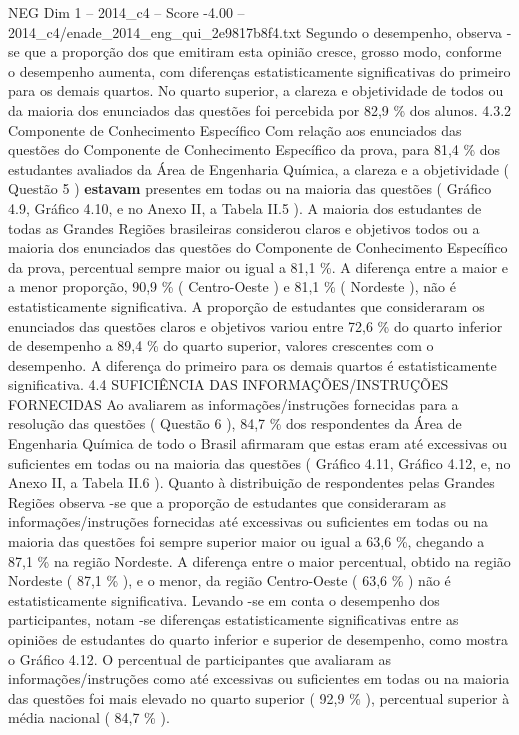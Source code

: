 \begin{textsample}{NEG Dim 1 – 2014\_c4 – Score -4.00 – 2014\_c4/enade\_2014\_eng\_qui\_2e9817b8f4.txt}
Segundo o desempenho, observa -se que a proporção dos que emitiram esta opinião cresce, grosso modo, conforme o desempenho aumenta, com diferenças estatisticamente significativas do primeiro para os demais quartos.
No quarto superior, a clareza e objetividade de todos ou da maioria dos enunciados das questões foi percebida por 82,9 \% dos alunos. 4.3.2 Componente de Conhecimento Específico Com relação aos enunciados das questões do Componente de Conhecimento Específico da prova, para 81,4 \% dos estudantes avaliados da Área de Engenharia Química, a clareza e a objetividade ( Questão 5 ) \textbf{estavam} presentes em todas ou na maioria das questões ( Gráfico 4.9, Gráfico 4.10, e no Anexo II, a Tabela II.5 ).
A maioria dos estudantes de todas as Grandes Regiões brasileiras considerou claros e objetivos todos ou a maioria dos enunciados das questões do Componente de Conhecimento Específico da prova, percentual sempre maior ou igual a 81,1 \%.
A diferença entre a maior e a menor proporção, 90,9 \% ( Centro-Oeste ) e 81,1 \% ( Nordeste ), não é estatisticamente significativa.
A proporção de estudantes que consideraram os enunciados das questões claros e objetivos variou entre 72,6 \% do quarto inferior de desempenho a 89,4 \% do quarto superior, valores crescentes com o desempenho.
A diferença do primeiro para os demais quartos é estatisticamente significativa. 4.4 SUFICIÊNCIA DAS INFORMAÇÕES/INSTRUÇÕES FORNECIDAS Ao avaliarem as informações/instruções fornecidas para a resolução das questões ( Questão 6 ), 84,7 \% dos respondentes da Área de Engenharia Química de todo o Brasil afirmaram que estas eram até excessivas ou suficientes em todas ou na maioria das questões ( Gráfico 4.11, Gráfico 4.12, e, no Anexo II, a Tabela II.6 ).
Quanto à distribuição de respondentes pelas Grandes Regiões observa -se que a proporção de estudantes que consideraram as informações/instruções fornecidas até excessivas ou suficientes em todas ou na maioria das questões foi sempre superior maior ou igual a 63,6 \%, chegando a 87,1 \% na região Nordeste.
A diferença entre o maior percentual, obtido na região Nordeste ( 87,1 \% ), e o menor, da região Centro-Oeste ( 63,6 \% ) não é estatisticamente significativa.
Levando -se em conta o desempenho dos participantes, notam -se diferenças estatisticamente significativas entre as opiniões de estudantes do quarto inferior e superior de desempenho, como mostra o Gráfico 4.12.
O percentual de participantes que avaliaram as informações/instruções como até excessivas ou suficientes em todas ou na maioria das questões foi mais elevado no quarto superior ( 92,9 \% ), percentual superior à média nacional ( 84,7 \% ).

\end{textsample}
